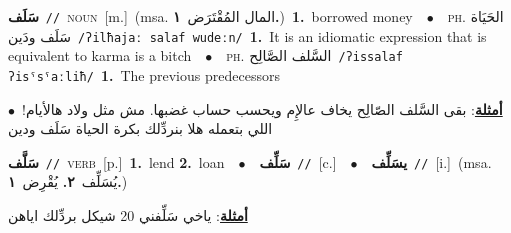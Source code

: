 \documentclass[10pt,a4paper,twoside]{article} %
\begin{document}
\begin{multicols}{2}
{\setlength\topsep{0pt}\textbf{\foreignlanguage{arabic}{سَلَف}}\ {\color{gray}\texttt{//}\color{black}}\ \textsc{noun}\ [m.]\ \color{gray}(msa. \foreignlanguage{arabic}{المال المُقْتَرَض}~\foreignlanguage{arabic}{\textbf{١.}})\color{black}\ \textbf{1.}~borrowed money\ \ $\bullet$\ \ \textsc{ph.} \color{gray} \foreignlanguage{arabic}{الحَيَاة سَلَف ودَين}\color{black}\ {\color{gray}\texttt{/{\sffamily ʔilħajaː salaf wudeːn}/}\color{black}}\ \textbf{1.}~It is an idiomatic expression that is equivalent to karma is a bitch\ \ $\bullet$\ \ \textsc{ph.} \color{gray} \foreignlanguage{arabic}{السَّلف الصَّالِح}\color{black}\ {\color{gray}\texttt{/{\sffamily ʔissalaf ʔisˤsˤaːliħ}/}\color{black}}\ \textbf{1.}~The previous predecessors\  \begin{flushright}\color{gray}\foreignlanguage{arabic}{\textbf{\underline{\foreignlanguage{arabic}{أمثلة}}}: بقى السَّلف الصّالِح يخاف عالإِم ويحسب حساب غضبها. مش مثل ولاد هالأيام!\ $\bullet$\ \  اللي بتعمله هلا بنردِّلك بكرة الحياة سَلَف ودين}\end{flushright}\color{black}} \vspace{2mm}

{\setlength\topsep{0pt}\textbf{\foreignlanguage{arabic}{سَلَّف}}\ {\color{gray}\texttt{//}\color{black}}\ \textsc{verb}\ [p.]\ \textbf{1.}~lend  \textbf{2.}~loan\ \ $\bullet$\ \ \setlength\topsep{0pt}\textbf{\foreignlanguage{arabic}{سَلِّف}}\ {\color{gray}\texttt{//}\color{black}}\ [c.]\ \ $\bullet$\ \ \setlength\topsep{0pt}\textbf{\foreignlanguage{arabic}{يسَلِّف}}\ {\color{gray}\texttt{//}\color{black}}\ [i.]\ \color{gray}(msa. \foreignlanguage{arabic}{يُسَلِّف}~\foreignlanguage{arabic}{\textbf{٢.}}  \foreignlanguage{arabic}{يُقْرِض}~\foreignlanguage{arabic}{\textbf{١.}})\color{black}\  \begin{flushright}\color{gray}\foreignlanguage{arabic}{\textbf{\underline{\foreignlanguage{arabic}{أمثلة}}}: ياخي سَلِّفني 20 شيكل بردِّلك اياهن}\end{flushright}\color{black}} \vspace{2mm}


\end{multicols}
\end{document}
